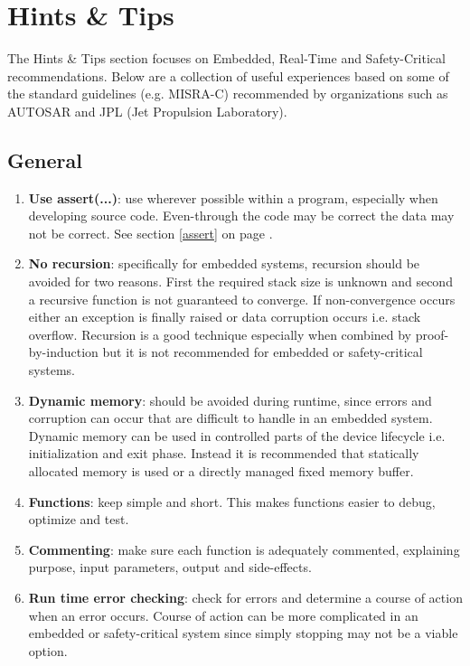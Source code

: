\section{Hints \& Tips}

The Hints \& Tips section focuses on Embedded, Real-Time and Safety-Critical recommendations. Below are a collection of useful experiences based on some of the standard guidelines (e.g. MISRA-C) recommended by organizations such as AUTOSAR and JPL (Jet Propulsion Laboratory). 

\subsection{General}

\begin{enumerate}

\item \textbf{Use assert(...)}: use wherever possible within a program, especially when developing source code. Even-through the code may be correct the data may not be correct. See section \ref{assert} on page \pageref{assert}.

\item \textbf{No recursion}: specifically for embedded systems, recursion should be avoided for two reasons. First the required stack size is unknown and second a recursive function is not guaranteed to converge. If non-convergence occurs either an exception is finally raised or data corruption occurs i.e. stack overflow. Recursion is a good technique especially when combined by proof-by-induction but it is not recommended for embedded or safety-critical systems.

\item \textbf{Dynamic memory}: should be avoided during runtime, since errors and corruption can occur that are difficult to handle in an embedded system. Dynamic memory can be used in controlled parts of the device lifecycle i.e. initialization and exit phase. Instead it is recommended that statically allocated memory is used or a directly managed fixed memory buffer.

\item \textbf{Functions}: keep simple and short. This makes functions easier to debug, optimize and test. 

\item \textbf{Commenting}: make sure each function is adequately commented, explaining purpose, input parameters, output and side-effects. 

\item \textbf{Run time error checking}: check for errors and determine a course of action when an error occurs. Course of action can be more complicated in an embedded or safety-critical system since simply stopping may not be a viable option.


\end{enumerate}
